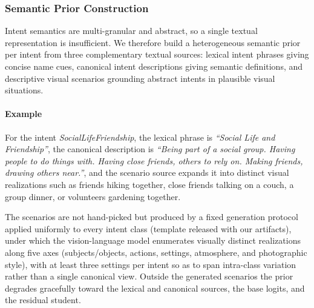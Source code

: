 \subsubsection{Semantic Prior Construction}

Intent semantics are multi-granular and abstract, so a single textual representation is insufficient. We therefore build a heterogeneous semantic prior per intent from three complementary textual sources: lexical intent phrases giving concise name cues, canonical intent descriptions giving semantic definitions, and descriptive visual scenarios grounding abstract intents in plausible visual situations.

\paragraph{Example}
For the intent \textit{SocialLifeFriendship}, the lexical phrase is \textit{``Social Life and Friendship''}, the canonical description is \textit{``Being part of a social group. Having people to do things with. Having close friends, others to rely on. Making friends, drawing others near.''}, and the scenario source expands it into distinct visual realizations such as friends hiking together, close friends talking on a couch, a group dinner, or volunteers gardening together.

The scenarios are not hand-picked but produced by a fixed generation protocol applied uniformly to every intent class (template released with our artifacts), under which the vision-language model enumerates visually distinct realizations along five axes (subjects/objects, actions, settings, atmosphere, and photographic style), with at least three settings per intent so as to span intra-class variation rather than a single canonical view. Outside the generated scenarios the prior degrades gracefully toward the lexical and canonical sources, the base logits, and the residual student.

